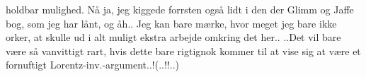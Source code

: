 \documentclass{report}
\begin{document}
holdbar mulighed. Nå ja, jeg kiggede forrsten også lidt i den der Glimm og Jaffe bog, som jeg har lånt, og åh.. Jeg kan bare mærke, hvor meget jeg bare ikke orker, at skulle ud i alt muligt ekstra arbejde omkring det her.. ..Det vil bare være så vanvittigt rart, hvis dette bare rigtignok kommer til at vise sig at være et fornuftigt Lorentz-inv.-argument..!(..!!..) %

\end{document}
